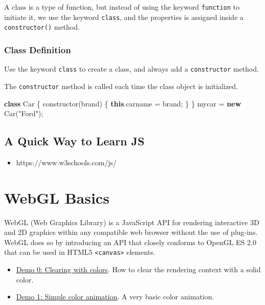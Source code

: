 \documentclass[11pt]{article}
\providecommand{\tightlist}{%
      \setlength{\itemsep}{0pt}\setlength{\parskip}{0pt}}
\newenvironment{Shaded}{}{}
\newcommand{\KeywordTok}[1]{\textcolor[rgb]{0.00,0.44,0.13}{\textbf{{#1}}}}
\newcommand{\StringTok}[1]{\textcolor[rgb]{0.25,0.44,0.63}{{#1}}}
\newcommand{\NormalTok}[1]{{#1}}
\newcommand{\OperatorTok}[1]{\textcolor[rgb]{0.40,0.40,0.40}{{#1}}}
\newcommand{\AttributeTok}[1]{\textcolor[rgb]{0.49,0.56,0.16}{{#1}}}
\begin{document}
A class is a type of function, but instead of using the keyword
\texttt{function} to initiate it, we use the keyword \texttt{class}, and
the properties is assigned inside a \texttt{constructor()} method.

    \subsubsection{Class Definition}\label{class-definition}

Use the keyword \texttt{class} to create a class, and always add a
\texttt{constructor} method.

The \texttt{constructor} method is called each time the class object is
initialized.

\begin{Shaded}
\begin{Highlighting}[]
\KeywordTok{class}\NormalTok{ Car }\OperatorTok{\{}
  \AttributeTok{constructor}\NormalTok{(brand) }\OperatorTok{\{}
    \KeywordTok{this}\NormalTok{.}\AttributeTok{carname} \OperatorTok{=}\NormalTok{ brand}\OperatorTok{;}
  \OperatorTok{\}}
\OperatorTok{\}}
\NormalTok{mycar }\OperatorTok{=} \KeywordTok{new} \AttributeTok{Car}\NormalTok{(}\StringTok{"Ford"}\NormalTok{)}\OperatorTok{;}
\end{Highlighting}
\end{Shaded}

    \subsection{A Quick Way to Learn JS}\label{a-quick-way-to-learn-js}

\begin{itemize}
\tightlist
\item
  https://www.w3schools.com/js/
\end{itemize}

    \section{WebGL Basics}\label{webgl-basics}

WebGL (Web Graphics Library) is a JavaScript API for rendering
interactive 3D and 2D graphics within any compatible web browser without
the use of plug-ins. WebGL does so by introducing an API that closely
conforms to OpenGL ES 2.0 that can be used in HTML5
\texttt{\textless{}canvas\textgreater{}} elements.

\begin{itemize}
\tightlist
\item
  \href{demo_0/demo.html}{Demo 0: Clearing with colors}. How to clear
  the rendering context with a solid color.
\item
  \href{demo_1/index.html}{Demo 1: Simple color animation}. A very basic
  color animation.
\end{itemize}
\end{document}
